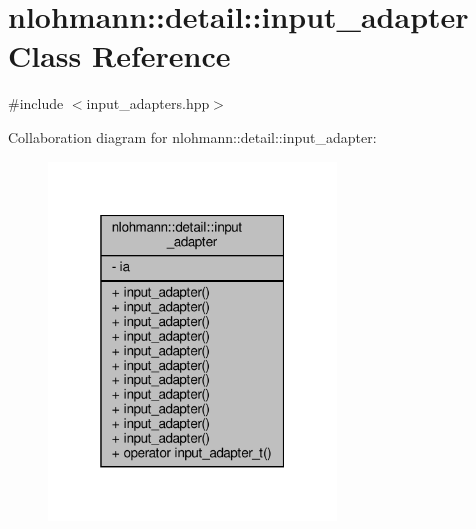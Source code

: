 \hypertarget{classnlohmann_1_1detail_1_1input__adapter}{}\section{nlohmann\+:\+:detail\+:\+:input\+\_\+adapter Class Reference}
\label{classnlohmann_1_1detail_1_1input__adapter}


{\ttfamily \#include $<$input\+\_\+adapters.\+hpp$>$}



Collaboration diagram for nlohmann\+:\+:detail\+:\+:input\+\_\+adapter\+:
\nopagebreak
\begin{figure}[H]
\begin{center}
\leavevmode
\includegraphics[width=217pt]{classnlohmann_1_1detail_1_1input__adapter__coll__graph}
\end{center}
\end{figure}
